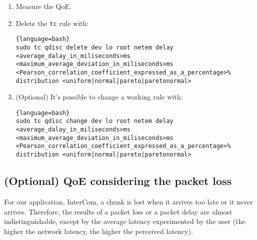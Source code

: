 \begin{enumerate}
\begin{enumerate}
    \begin{lstlisting}{language=bash}
sudo tc qdisc add dev lo root netem delay 100ms 10ms 25% distribution normal
    \end{lstlisting}
    
  \item Check that the rule has been installed with the command:
    
    \begin{lstlisting}{language=bash}
tc qdisc show dev lo
    \end{lstlisting}
    
    that should output:
    
    \begin{lstlisting}{language=bash}
qdisc netem 8009: root refcnt 2 limit 1000 delay 100ms  10ms 25%
    \end{lstlisting}
  \end{enumerate}

\item Measure the QoE.

\item Delete the \texttt{tc} rule with:
  
  \begin{lstlisting}{language=bash}
sudo tc qdisc delete dev lo root netem delay <average_dalay_in_miliseconds>ms <maximum_average_deviation_in_miliseconds>ms <Pearson_correlation_coefficient_expressed_as_a_percentage>% distribution <uniform|normal|pareto|paretonormal>
  \end{lstlisting}

\item (Optional) It's possible to change a working rule with:

  \begin{lstlisting}{language=bash}
sudo tc qdisc change dev lo root netem delay <average_dalay_in_miliseconds>ms <maximum_average_deviation_in_miliseconds>ms <Pearson_correlation_coefficient_expressed_as_a_percentage>% distribution <uniform|normal|pareto|paretonormal>
  \end{lstlisting}
  
\end{enumerate}

\subsection{(Optional) QoE considering the packet loss}

For our application, InterCom, a chunk is lost when it arrives too
late or it never arrives. Therefore, the results of a packet loss or a
packet delay are almost indistinguishable, except by the average
latency experimented by the user (the higher the network latency, the
higher the perceived latency).

